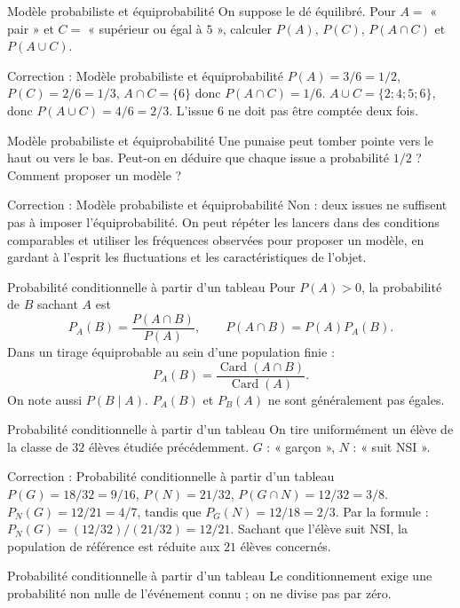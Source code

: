 \documentclass[aspectratio=169,10pt]{beamer}
\providecommand{\Card}{\operatorname{Card}}
\begin{document}
\begin{frame}{Modèle probabiliste et équiprobabilité}
On suppose le dé équilibré. Pour \(A=\) « pair » et \(C=\) « supérieur ou égal à \(5\) », calculer \(P(A)\), \(P(C)\), \(P(A\cap C)\) et \(P(A\cup C)\).
\end{frame}
\begin{frame}{Correction : Modèle probabiliste et équiprobabilité}
\(P(A)=3/6=1/2\), \(P(C)=2/6=1/3\), \(A\cap C=\{6\}\) donc \(P(A\cap C)=1/6\). \(A\cup C=\{2;4;5;6\}\), donc \(P(A\cup C)=4/6=2/3\). L'issue \(6\) ne doit pas être comptée deux fois.
\end{frame}
\begin{frame}{Modèle probabiliste et équiprobabilité}
Une punaise peut tomber pointe vers le haut ou vers le bas. Peut-on en déduire que chaque issue a probabilité \(1/2\) ? Comment proposer un modèle ?
\end{frame}
\begin{frame}{Correction : Modèle probabiliste et équiprobabilité}
Non : deux issues ne suffisent pas à imposer l'équiprobabilité. On peut répéter les lancers dans des conditions comparables et utiliser les fréquences observées pour proposer un modèle, en gardant à l'esprit les fluctuations et les caractéristiques de l'objet.
\end{frame}
\begin{frame}{Probabilité conditionnelle à partir d'un tableau}
Pour \(P(A)>0\), la probabilité de \(B\) sachant \(A\) est
\[P_A(B)=\dfrac{P(A\cap B)}{P(A)},\qquad P(A\cap B)=P(A)P_A(B).\]
Dans un tirage équiprobable au sein d'une population finie :
\[P_A(B)=\dfrac{\Card(A\cap B)}{\Card(A)}.\]
On note aussi \(P(B\mid A)\). \(P_A(B)\) et \(P_B(A)\) ne sont généralement pas égales.
\end{frame}
\begin{frame}{Probabilité conditionnelle à partir d'un tableau}
On tire uniformément un élève de la classe de \(32\) élèves étudiée précédemment. \(G\) : « garçon », \(N\) : « suit NSI ».
\end{frame}
\begin{frame}{Correction : Probabilité conditionnelle à partir d'un tableau}
\(P(G)=18/32=9/16\), \(P(N)=21/32\), \(P(G\cap N)=12/32=3/8\).
\(P_N(G)=12/21=4/7\), tandis que \(P_G(N)=12/18=2/3\).
Par la formule : \(P_N(G)=(12/32)/(21/32)=12/21\). Sachant que l'élève suit NSI, la population de référence est réduite aux \(21\) élèves concernés.
\end{frame}
\begin{frame}{Probabilité conditionnelle à partir d'un tableau}
Le conditionnement exige une probabilité non nulle de l'événement connu ; on ne divise pas par zéro.
\end{frame}
\end{document}
